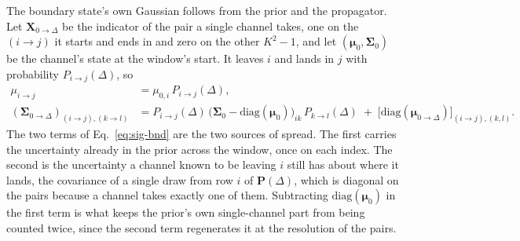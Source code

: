 The boundary state's own Gaussian follows from the prior and the propagator. Let
$\mathbf{X}_{0\to\Delta}$ be the indicator of the pair a single channel takes, one on the
$(i\to j)$ it starts and ends in and zero on the other $K^2-1$, and let
$(\bm{\mu}_0,\bm{\Sigma}_0)$ be the channel's state at the window's start. It leaves $i$ and
lands in $j$ with probability $P_{i\to j}(\Delta)$, so
\begin{align}
  \mu_{i\to j} &= \mu_{0,i}\,P_{i\to j}(\Delta), \label{eq:mu-bnd}\\
  (\bm{\Sigma}_{0\to\Delta})_{(i\to j),(k\to l)} &=
    P_{i\to j}(\Delta)\,\bigl(\bm{\Sigma}_0-\mathrm{diag}(\bm{\mu}_0)\bigr)_{i k}\,
    P_{k\to l}(\Delta)
    \;+\; \bigl[\mathrm{diag}(\bm{\mu}_{0\to\Delta})\bigr]_{(i\to j),(k,l)}.
  \label{eq:sig-bnd}
\end{align}
The two terms of Eq.~\ref{eq:sig-bnd} are the two sources of spread. The first carries the
uncertainty already in the prior across the window, once on each index. The second is the
uncertainty a channel known to be leaving $i$ still has about where it lands, the covariance
of a single draw from row $i$ of $\mathbf{P}(\Delta)$, which is diagonal on the pairs
because a channel takes exactly one of them. Subtracting $\mathrm{diag}(\bm{\mu}_0)$ in the
first term is what keeps the prior's own single-channel part from being counted twice, since
the second term regenerates it at the resolution of the pairs.

